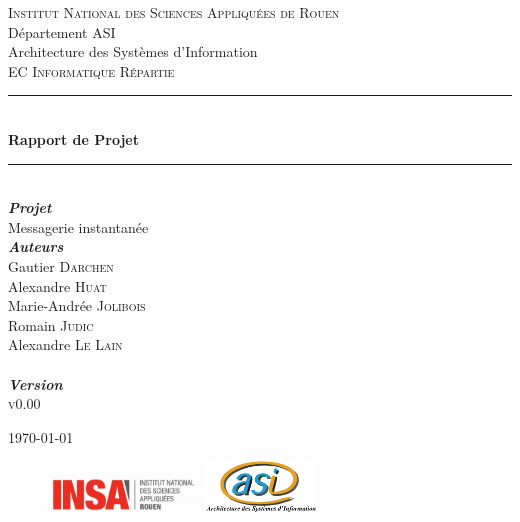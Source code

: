 \documentclass[11pt,dvipsnames,svgnames]{report}
\begin{document}
\begin{titlepage}
\newcommand{\HRule}{\rule{\linewidth}{0.5mm}}
\center
{}\textsc{\huge Institut National des Sciences Appliquées de Rouen}\\[0.7cm]
\LARGE Département ASI~\\[0.5cm]
\Large{Architecture des Systèmes d'Information} ~\\[1.5cm]
\textsc{\Large EC Informatique Répartie}\\[0.5cm]

\HRule \\[0.4cm]
{ \huge \bfseries Rapport de Projet}\\[0.18cm] \HRule \\[1.5cm]

\LARGE \emph{\textbf{Projet}} \\
{Messagerie instantanée}\\[1.3cm]

\large
	\emph{\textbf{Auteurs}}\\
	Gautier \textsc{Darchen} \\
	Alexandre \textsc{Huat} \\
	Marie-Andrée \textsc{Jolibois} \\
	Romain \textsc{Judic} \\
	Alexandre \textsc{Le Lain}\\[0.3cm]

~\\[0.5cm]
\Large \emph{\textbf{Version}}\\
	\textsc{v0.00}

\vfill{\today}

\begin{figure}
\includegraphics[width=4cm]{images/LogoINSA.png}\hfill
\includegraphics[width=3cm]{images/logoasi.png}
\end{figure}


 \end{titlepage}
\end{document}
